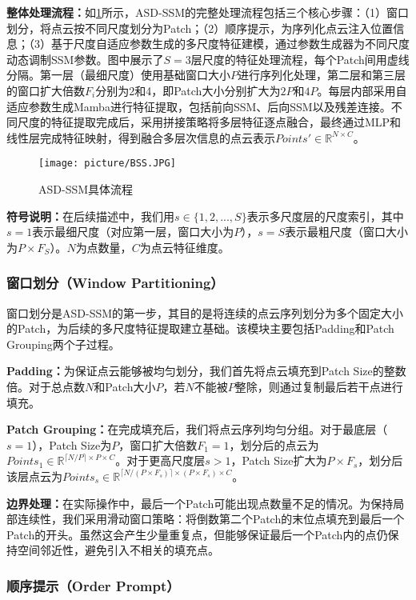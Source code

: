 \documentclass[preprint,12pt]{elsarticle}
\begin{document}
\textbf{整体处理流程：}如\cref{fig:bss}所示，ASD-SSM的完整处理流程包括三个核心步骤：（1）窗口划分，将点云按不同尺度划分为Patch；（2）顺序提示，为序列化点云注入位置信息；（3）基于尺度自适应参数生成的多尺度特征建模，通过参数生成器为不同尺度动态调制SSM参数。图中展示了$S=3$层尺度的特征处理流程，每个Patch间用虚线分隔。第一层（最细尺度）使用基础窗口大小$P$进行序列化处理，第二层和第三层的窗口扩大倍数$F_i$分别为2和4，即Patch大小分别扩大为$2P$和$4P$。每层内部采用自适应参数生成Mamba进行特征提取，包括前向SSM、后向SSM以及残差连接。不同尺度的特征提取完成后，采用拼接策略将多层特征逐点融合，最终通过MLP和线性层完成特征映射，得到融合多层次信息的点云表示$Points'\in\mathbb{R}^{N\times C}$。

\begin{figure}[htbp]
	\centering
	\texttt{[image: picture/BSS.JPG]}
	\caption{ASD-SSM具体流程}
	\label{fig:bss}
\end{figure}


\textbf{符号说明：}在后续描述中，我们用$s \in \{1, 2, ..., S\}$表示多尺度层的尺度索引，其中$s=1$表示最细尺度（对应第一层，窗口大小为$P$），$s=S$表示最粗尺度（窗口大小为$P \times F_S$）。$N$为点数量，$C$为点云特征维度。


\subsubsection{窗口划分（Window Partitioning）}

窗口划分是ASD-SSM的第一步，其目的是将连续的点云序列划分为多个固定大小的Patch，为后续的多尺度特征提取建立基础。该模块主要包括Padding和Patch Grouping两个子过程。

\textbf{Padding：}为保证点云能够被均匀划分，我们首先将点云填充到Patch Size的整数倍。对于总点数$N$和Patch大小$P$，若$N$不能被$P$整除，则通过复制最后若干点进行填充。

\textbf{Patch Grouping：}在完成填充后，我们将点云序列均匀分组。对于最底层（$s=1$），Patch Size为$P$，窗口扩大倍数$F_1=1$，划分后的点云为$Points_1\in\mathbb{R}^{\lceil N/P \rceil\times P \times C}$。对于更高尺度层$s>1$，Patch Size扩大为$P\times F_s$，划分后该层点云为$Points_s\in\mathbb{R}^{\lceil N/(P\times F_s) \rceil\times (P\times F_s) \times C}$。

\textbf{边界处理：}在实际操作中，最后一个Patch可能出现点数量不足的情况。为保持局部连续性，我们采用滑动窗口策略：将倒数第二个Patch的末位点填充到最后一个Patch的开头。虽然这会产生少量重复点，但能够保证最后一个Patch内的点仍保持空间邻近性，避免引入不相关的填充点。


\subsubsection{顺序提示（Order Prompt）}
\end{document}
